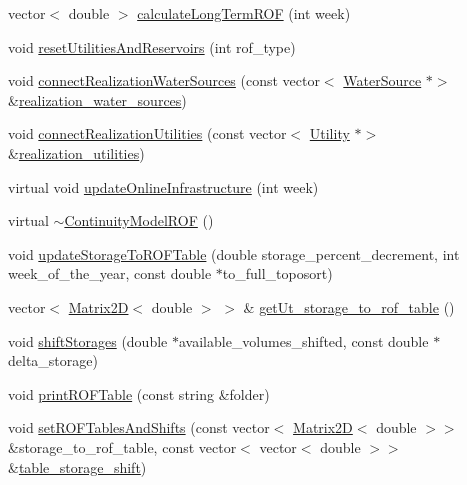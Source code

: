 \begin{DoxyCompactItemize}
\item 
vector$<$ double $>$ \mbox{\hyperlink{classContinuityModelROF_ab6e6125e6ea195d7c29a0c6d2203d51c}{calculate\+Long\+Term\+R\+OF}} (int week)
\item 
void \mbox{\hyperlink{classContinuityModelROF_acd72d71a29cef49c4de3d111378b76c7}{reset\+Utilities\+And\+Reservoirs}} (int rof\+\_\+type)
\item 
void \mbox{\hyperlink{classContinuityModelROF_a0c12b5dad97c3783361baad7e53a2634}{connect\+Realization\+Water\+Sources}} (const vector$<$ \mbox{\hyperlink{classWaterSource}{Water\+Source}} $\ast$$>$ \&\mbox{\hyperlink{classContinuityModelROF_a77048d247b8d1f70fbdd31559b4d3337}{realization\+\_\+water\+\_\+sources}})
\item 
void \mbox{\hyperlink{classContinuityModelROF_abc16c650a854b60dfc42ab2d32ef4b0c}{connect\+Realization\+Utilities}} (const vector$<$ \mbox{\hyperlink{classUtility}{Utility}} $\ast$$>$ \&\mbox{\hyperlink{classContinuityModelROF_a75c6823d8dd37f274ee91ce158088dc4}{realization\+\_\+utilities}})
\item 
virtual void \mbox{\hyperlink{classContinuityModelROF_af09f22c4fd69db45d3c8962713801287}{update\+Online\+Infrastructure}} (int week)
\item 
virtual \mbox{\hyperlink{classContinuityModelROF_a0098bd7efa9e57a7ff0efc4c9b5aa340}{$\sim$\+Continuity\+Model\+R\+OF}} ()
\item 
void \mbox{\hyperlink{classContinuityModelROF_a28834584763c3aa27a6f0917aa68926f}{update\+Storage\+To\+R\+O\+F\+Table}} (double storage\+\_\+percent\+\_\+decrement, int week\+\_\+of\+\_\+the\+\_\+year, const double $\ast$to\+\_\+full\+\_\+toposort)
\item 
vector$<$ \mbox{\hyperlink{classMatrix2D}{Matrix2D}}$<$ double $>$ $>$ \& \mbox{\hyperlink{classContinuityModelROF_ab4a793f312b693d98c80e4b9545a8bb5}{get\+Ut\+\_\+storage\+\_\+to\+\_\+rof\+\_\+table}} ()
\item 
void \mbox{\hyperlink{classContinuityModelROF_a4f2b25687bcdeb4a88e22397c84789de}{shift\+Storages}} (double $\ast$available\+\_\+volumes\+\_\+shifted, const double $\ast$delta\+\_\+storage)
\item 
void \mbox{\hyperlink{classContinuityModelROF_a1bb8362ce39e694937a787805613e106}{print\+R\+O\+F\+Table}} (const string \&folder)
\item 
void \mbox{\hyperlink{classContinuityModelROF_a1d3f8b8db62ec7b399095c89ce861163}{set\+R\+O\+F\+Tables\+And\+Shifts}} (const vector$<$ \mbox{\hyperlink{classMatrix2D}{Matrix2D}}$<$ double $>$$>$ \&storage\+\_\+to\+\_\+rof\+\_\+table, const vector$<$ vector$<$ double $>$$>$ \&\mbox{\hyperlink{classContinuityModelROF_a1a90c8816944aab36f395e89f7b84c06}{table\+\_\+storage\+\_\+shift}})

\end{DoxyCompactItemize}
